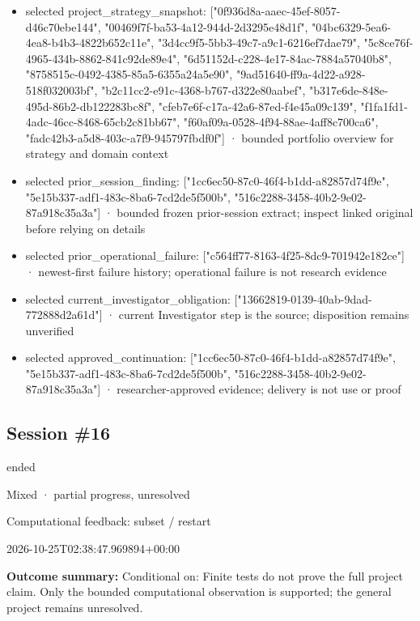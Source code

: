 \documentclass[11pt]{article}
\begin{document}
\begin{itemize}
\item selected project\_strategy\_snapshot: ["0f936d8a-aaec-45ef-8057-d46c70ebe144", "00469f7f-ba53-4a12-944d-2d3295e48d1f", "04bc6329-5ea6-4ea8-b4b3-4822b652c11e", "3d4cc9f5-5bb3-49c7-a9c1-6216ef7dae79", "5c8ce76f-4965-434b-8862-841c92de89e4", "6d51152d-c228-4e17-84ac-7884a57040b8", "8758515c-0492-4385-85a5-6355a24a5e90", "9ad51640-ff9a-4d22-a928-518f032003bf", "b2c11cc2-e91c-4368-b767-d322e80aabef", "b317e6de-848e-495d-86b2-db122283bc8f", "cfeb7e6f-c17a-42a6-87ed-f4e45a09c139", "f1fa1fd1-4adc-46cc-8468-65cb2c81bb67", "f60af09a-0528-4f94-88ae-4aff8c700ca6", "fadc42b3-a5d8-403c-a7f9-945797fbdf0f"] · bounded portfolio overview for strategy and domain context
\item selected prior\_session\_finding: ["1cc6ec50-87c0-46f4-b1dd-a82857d74f9e", "5e15b337-adf1-483c-8ba6-7cd2de5f500b", "516c2288-3458-40b2-9e02-87a918c35a3a"] · bounded frozen prior-session extract; inspect linked original before relying on details
\item selected prior\_operational\_failure: ["c564ff77-8163-4f25-8dc9-701942e182ce"] · newest-first failure history; operational failure is not research evidence
\item selected current\_investigator\_obligation: ["13662819-0139-40ab-9dad-772888d2a61d"] · current Investigator step is the source; disposition remains unverified
\item selected approved\_continuation: ["1cc6ec50-87c0-46f4-b1dd-a82857d74f9e", "5e15b337-adf1-483c-8ba6-7cd2de5f500b", "516c2288-3458-40b2-9e02-87a918c35a3a"] · researcher-approved evidence; delivery is not use or proof
\end{itemize}
\subsection{Session \#16}
\begin{description}[style=nextline,font=\normalfont\bfseries,leftmargin=0pt,labelsep=0pt]
\item[Execution status] ended
\item[Outcome] Mixed · partial progress, unresolved
\item[Strategy] Computational feedback: subset / restart
\item[Started] 2026-10-25T02:38:47.969894+00:00
\end{description}
\textbf{Outcome summary:} Conditional on: Finite tests do not prove the full project claim. Only the bounded computational observation is supported; the general project remains unresolved.\par
\end{document}
